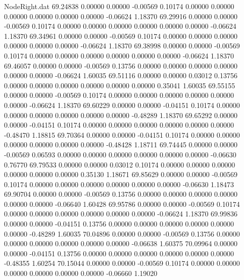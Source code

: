 \begin{filecontents}{NodeRight.dat}
  69.24838    0.00000    0.00000    -0.00569    0.10174    0.00000    0.00000    0.00000    0.00000    0.00000    0.00000   -0.06624    1.18370
  69.29916    0.00000    0.00000    -0.00569    0.10174    0.00000    0.00000    0.00000    0.00000    0.00000    0.00000   -0.06624    1.18370
  69.34961    0.00000    0.00000    -0.00569    0.10174    0.00000    0.00000    0.00000    0.00000    0.00000    0.00000   -0.06624    1.18370
  69.38998    0.00000    0.00000    -0.00569    0.10174    0.00000    0.00000    0.00000    0.00000    0.00000    0.00000   -0.06624    1.18370
  69.46057    0.00000    0.00000    -0.00569    0.13756    0.00000    0.00000    0.00000    0.00000    0.00000    0.00000   -0.06624    1.60035
  69.51116    0.00000    0.00000     0.03012    0.13756    0.00000    0.00000    0.00000    0.00000    0.00000    0.00000    0.35041    1.60035
  69.55155    0.00000    0.00000    -0.00569    0.10174    0.00000    0.00000    0.00000    0.00000    0.00000    0.00000   -0.06624    1.18370
  69.60229    0.00000    0.00000    -0.04151    0.10174    0.00000    0.00000    0.00000    0.00000    0.00000    0.00000   -0.48289    1.18370
  69.65292    0.00000    0.00000    -0.04151    0.10174    0.00000    0.00000    0.00000    0.00000    0.00000    0.00000   -0.48470    1.18815
  69.70364    0.00000    0.00000    -0.04151    0.10174    0.00000    0.00000    0.00000    0.00000    0.00000    0.00000   -0.48428    1.18711
  69.74445    0.00000    0.00000    -0.00569    0.06593    0.00000    0.00000    0.00000    0.00000    0.00000    0.00000   -0.06630    0.76770
  69.79533    0.00000    0.00000     0.03012    0.10174    0.00000    0.00000    0.00000    0.00000    0.00000    0.00000    0.35130    1.18671
  69.85629    0.00000    0.00000    -0.00569    0.10174    0.00000    0.00000    0.00000    0.00000    0.00000    0.00000   -0.06630    1.18473
  69.90704    0.00000    0.00000    -0.00569    0.13756    0.00000    0.00000    0.00000    0.00000    0.00000    0.00000   -0.06640    1.60428
  69.95786    0.00000    0.00000    -0.00569    0.10174    0.00000    0.00000    0.00000    0.00000    0.00000    0.00000   -0.06624    1.18370
  69.99836    0.00000    0.00000    -0.04151    0.13756    0.00000    0.00000    0.00000    0.00000    0.00000    0.00000   -0.48289    1.60035
  70.04896    0.00000    0.00000    -0.00569    0.13756    0.00000    0.00000    0.00000    0.00000    0.00000    0.00000   -0.06638    1.60375
  70.09964    0.00000    0.00000    -0.04151    0.13756    0.00000    0.00000    0.00000    0.00000    0.00000    0.00000   -0.48355    1.60254
  70.15044    0.00000    0.00000    -0.00569    0.10174    0.00000    0.00000    0.00000    0.00000    0.00000    0.00000   -0.06660    1.19020

\end{filecontents}
